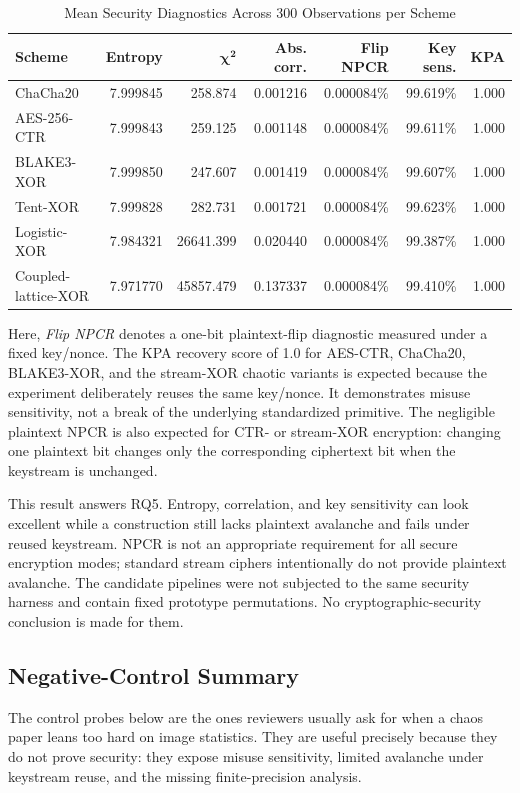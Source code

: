 \documentclass[twocolumn,runningheads]{svjour3}
\begin{document}
\begin{table}[t]
\caption{Mean Security Diagnostics Across 300 Observations per Scheme}
\label{tab:security}
\centering
\setlength{\tabcolsep}{4pt}
\begin{tabular}{lrrrrrr}
\toprule
\textbf{Scheme} & \textbf{Entropy} & $\boldsymbol{\chi^2}$ & \textbf{Abs. corr.} & \textbf{Flip NPCR} & \textbf{Key sens.} & \textbf{KPA} \\
\midrule
ChaCha20 & 7.999845 & 258.874 & 0.001216 & 0.000084\% & 99.619\% & 1.000 \\
AES-256-CTR & 7.999843 & 259.125 & 0.001148 & 0.000084\% & 99.611\% & 1.000 \\
BLAKE3-XOR & 7.999850 & 247.607 & 0.001419 & 0.000084\% & 99.607\% & 1.000 \\
Tent-XOR & 7.999828 & 282.731 & 0.001721 & 0.000084\% & 99.623\% & 1.000 \\
Logistic-XOR & 7.984321 & 26641.399 & 0.020440 & 0.000084\% & 99.387\% & 1.000 \\
Coupled-lattice-XOR & 7.971770 & 45857.479 & 0.137337 & 0.000084\% & 99.410\% & 1.000 \\
\bottomrule
\end{tabular}
\end{table}

Here, \emph{Flip NPCR} denotes a one-bit plaintext-flip diagnostic measured
under a fixed key/nonce. The KPA recovery score of 1.0 for AES-CTR, ChaCha20,
BLAKE3-XOR, and the
stream-XOR chaotic variants is expected because the experiment deliberately
reuses the same key/nonce. It demonstrates misuse sensitivity, not a break of
the underlying standardized primitive. The negligible plaintext NPCR is also
expected for CTR- or stream-XOR encryption: changing one plaintext bit changes
only the corresponding ciphertext bit when the keystream is unchanged.

This result answers RQ5. Entropy, correlation, and key sensitivity can look
excellent while a construction still lacks plaintext avalanche and fails
under reused keystream. NPCR is not an appropriate requirement for all secure
encryption modes; standard stream ciphers intentionally do not provide
plaintext avalanche. The candidate pipelines were not subjected to the same
security harness and contain fixed prototype permutations. No
cryptographic-security conclusion is made for them.

\subsection{Negative-Control Summary}
The control probes below are the ones reviewers usually ask for when a chaos
paper leans too hard on image statistics. They are useful precisely because
they do not prove security: they expose misuse sensitivity, limited avalanche
under keystream reuse, and the missing finite-precision analysis.
\end{document}
